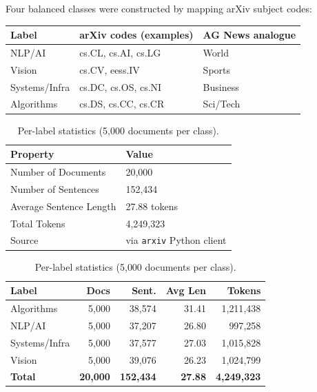 \documentclass[10pt,a4paper]{article}
\begin{document}
Four balanced classes were constructed by mapping arXiv subject codes:

\begin{center}
\begin{tabular}{lll}
\toprule
\textbf{Label} & \textbf{arXiv codes (examples)} & \textbf{AG News analogue} \\
\midrule
NLP/AI        & cs.CL, cs.AI, cs.LG & World \\
Vision        & cs.CV, eess.IV       & Sports \\
Systems/Infra & cs.DC, cs.OS, cs.NI  & Business \\
Algorithms    & cs.DS, cs.CC, cs.CR  & Sci/Tech \\
\bottomrule
\end{tabular}
\end{center}

\begin{table}[H]
\centering

\begin{minipage}[t]{0.48\linewidth}
\centering
\small
\caption{Global dataset statistics.}
\begin{tabular}{ll}
\toprule
\textbf{Property} & \textbf{Value} \\
\midrule
Number of Documents & 20{,}000 \\
Number of Sentences & 152{,}434 \\
Average Sentence Length & 27.88 tokens \\
Total Tokens & 4{,}249{,}323 \\
Source & via \texttt{arxiv} Python client \\
\bottomrule
\end{tabular}
\end{minipage}
\hfill
\begin{minipage}[t]{0.48\linewidth}
\centering
\small
\caption{Per-label statistics (5{,}000 documents per class).}
\begin{tabular}{lrrrr}
\toprule
\textbf{Label} & \textbf{Docs} & \textbf{Sent.} & \textbf{Avg Len} & \textbf{Tokens} \\
\midrule
Algorithms    & 5{,}000 & 38{,}574 & 31.41 & 1{,}211{,}438 \\
NLP/AI        & 5{,}000 & 37{,}207 & 26.80 &   997{,}258 \\
Systems/Infra & 5{,}000 & 37{,}577 & 27.03 & 1{,}015{,}828 \\
Vision        & 5{,}000 & 39{,}076 & 26.23 & 1{,}024{,}799 \\
\midrule
\textbf{Total} & \textbf{20{,}000} & \textbf{152{,}434} & \textbf{27.88} & \textbf{4{,}249{,}323} \\
\bottomrule
\end{tabular}
\end{minipage}

\end{table}
\end{document}
